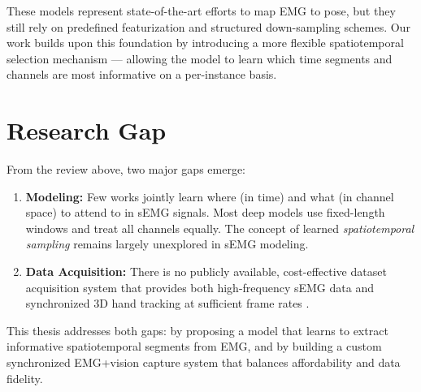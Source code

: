 These models represent state-of-the-art efforts to map EMG to pose, but they still rely on predefined featurization and structured down-sampling schemes. Our work builds upon this foundation by introducing a more flexible spatiotemporal selection mechanism — allowing the model to learn which time segments and channels are most informative on a per-instance basis.

\section{Research Gap}

From the review above, two major gaps emerge:
\begin{enumerate}
    \item \textbf{Modeling:} Few works jointly learn where (in time) and what (in channel space) to attend to in sEMG signals. Most deep models use fixed-length windows and treat all channels equally. The concept of learned \textit{spatiotemporal sampling} remains largely unexplored in sEMG modeling.
    \item \textbf{Data Acquisition:} There is no publicly available, cost-effective dataset acquisition system that provides both high-frequency sEMG data and synchronized 3D hand tracking at sufficient frame rates \cite{seo2024posture}.
\end{enumerate}

This thesis addresses both gaps: by proposing a model that learns to extract informative spatiotemporal segments from EMG, and by building a custom synchronized EMG+vision capture system that balances affordability and data fidelity.